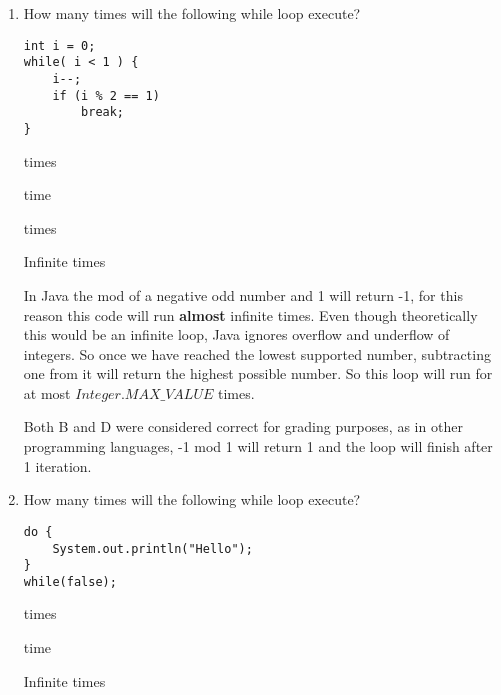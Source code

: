 \Instructions

\begin{enumerate}
    
\item {} How many times will the following while loop execute?
\begin{lstlisting}
int i = 0;
while( i < 1 ) {
    i--;
    if (i % 2 == 1)
    	break;
}

\end{lstlisting}

\begin{oneparchoices} 
\hspace{0.2cm}
  times\newline
 
  time \newline
 
  times \newline
 
 \choice Infinite times \newline
 
 \Ans In Java the mod of a negative odd number and 1 will return -1, for this reason this code will run \textbf{almost} infinite times. Even though theoretically this would be an infinite loop, Java ignores overflow and underflow of integers. So once we have reached the lowest supported number, subtracting one from it will return the highest possible number. So this loop will run for at most $Integer.MAX\_VALUE$ times.
 
 Both B and D were considered correct for grading purposes, as in other programming languages, -1 mod 1 will return 1 and the loop will finish after 1 iteration. 
 
\end{oneparchoices}

\item {} How many times will the following while loop execute? 
\begin{lstlisting}
do {
	System.out.println("Hello");
}
while(false);
\end{lstlisting}

\begin{oneparchoices} 
\hspace{0.2cm}
  times\newline
 
 \choice {} time \newline
 
 \choice Infinite times \newline
 

\end{oneparchoices}
\end{enumerate}
